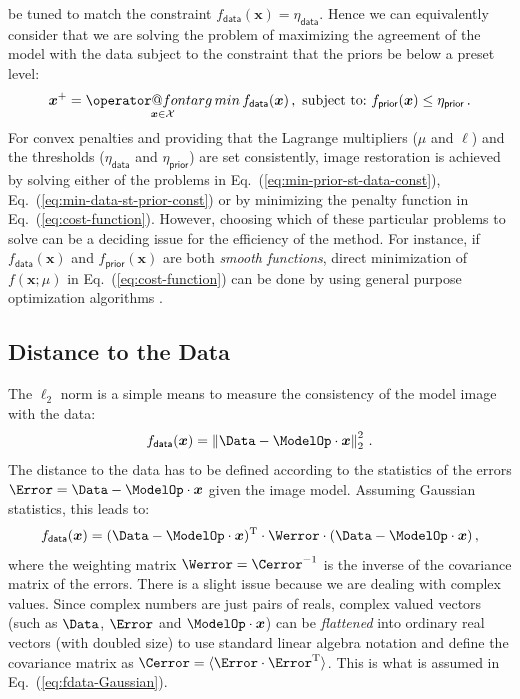 \documentclass{article}
\makeatletter
\newcommand{\MathFuncWithLimits}[1]{\mathop{\operator@font #1}\limits}
\newcommand{\Tag}[1]{\mathsf{#1}}        %
\newcommand{\V}[1]{\boldsymbol{#1}}      %
\newcommand{\T}{^\mathrm{T}}             %
\newcommand{\QuadTerm}[2]{ #2\T\cdot #1\cdot #2}
\newcommand{\Norm}[1]{\left\Vert #1\right\Vert}
\newcommand{\avg}[1]{\langle #1\rangle}
\newcommand{\argmin}{\MathFuncWithLimits{arg\,min}}
\newcommand{\Eq}[1]{Eq.~(\ref{#1})}
\newcommand{\Param}{x}
\newcommand{\VParam}{\V{\Param}}
\newcommand{\FeasibleSet}{\mathcal{X}}
\newcommand{\DataTag}{\Tag{data}}
\newcommand{\PriorTag}{\Tag{prior}}
\newcommand{\DataLevel}{\eta_\DataTag}
\newcommand{\PriorLevel}{\eta_\PriorTag}
\newcommand{\Fcost}{f}
\newcommand{\Fdata}{\Fcost_\DataTag}
\newcommand{\Fprior}{\Fcost_\PriorTag}
\makeatother
\begin{document}
be tuned to match the constraint $\Fdata(\VParam)=\DataLevel$.  Hence we can
equivalently consider that we are solving the problem of maximizing the
agreement of the model with the data subject to the constraint that the priors
be below a preset level:
\begin{equation}
  \label{eq:min-data-st-prior-const}
  \VParam^{+} = \argmin_{\VParam\in\FeasibleSet} \Fdata(\VParam)
  \,,\ \text{subject to:\ }
  \Fprior(\VParam) \le \PriorLevel \, .
\end{equation}
For convex penalties and providing that the Lagrange multipliers ($\mu$ and
$\ell$) and the thresholds ($\DataLevel$ and $\PriorLevel$) are set
consistently, image restoration is achieved by solving either of the
problems in \Eq{eq:min-prior-st-data-const}, \Eq{eq:min-data-st-prior-const}
or by minimizing the penalty function in \Eq{eq:cost-function}.  However,
choosing which of these particular problems to solve can be a deciding issue
for the efficiency of the method.  For instance, if $\Fdata(\VParam)$ and
$\Fprior(\VParam)$ are both \emph{smooth functions}, direct minimization of
$\Fcost(\VParam; \mu)$ in \Eq{eq:cost-function} can be done by using general
purpose optimization algorithms
\citep{Nocedal_Wright-2006-numerical_optimization}.


\subsection{Distance to the Data}
\label{sec:fdata}

The $\ell_2$ norm is a simple means to measure the consistency of the model
image with the data:
\begin{equation}
  \label{eq:fdata-L2}
  \Fdata(\VParam) = \Norm{\Data - \ModelOp\cdot\VParam}^2_2\,.
\end{equation}
The distance to the data has to be defined according to the statistics of the
errors $\Error = \Data - \ModelOp\cdot\VParam$ given the image model.
Assuming Gaussian statistics, this leads to:
\begin{equation}
  \label{eq:fdata-Gaussian}
  \Fdata(\VParam) =
  \QuadTerm{\Werror}{(\Data - \ModelOp\cdot\VParam)} \,,
\end{equation}
where the weighting matrix $\Werror=\Cerror^{-1}$ is the inverse of the
covariance matrix of the errors.  There is a slight issue because we are
dealing with complex values.  Since complex numbers are just pairs of reals,
complex valued vectors (such as $\Data$, $\Error$ and $\ModelOp\cdot\VParam$)
can be \emph{flattened} into ordinary real vectors (with doubled size) to use
standard linear algebra notation and define the covariance matrix as
$\Cerror=\avg{\Error\cdot\Error\T}$.  This is what is assumed in
\Eq{eq:fdata-Gaussian}.
\end{document}
